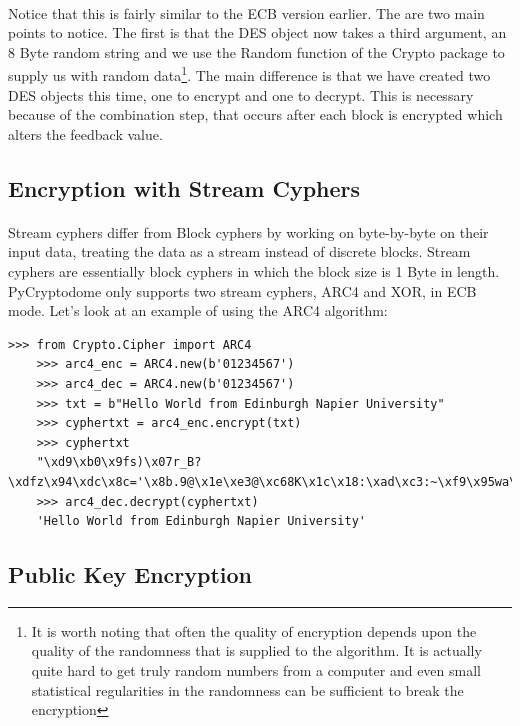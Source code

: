 \documentclass[12pt, a4paper, oneside]{book}
\begin{document}
{\paragraph{} Notice that this is fairly similar to the ECB version earlier. The are two main points to notice. The first is that the DES object now takes a third argument, an 8 Byte random string and we use the Random function of the Crypto package to supply us with random data\footnote{It is worth noting that often the quality of encryption depends upon the quality of the randomness that is supplied to the algorithm. It is actually quite hard to get truly random numbers from a computer and even small statistical regularities in the randomness can be sufficient to break the encryption}. The main difference is that we have created two DES objects this time, one to encrypt and one to decrypt. This is necessary because of the combination step, that occurs after each block is encrypted which alters the feedback value.

\subsection{Encryption with Stream Cyphers}
\paragraph{} Stream cyphers differ from Block cyphers by working on byte-by-byte on their input data, treating the data as a stream instead of discrete blocks. Stream cyphers are essentially block cyphers in which the block size is 1 Byte in length. PyCryptodome only supports two stream cyphers, ARC4 and XOR, in ECB mode. Let's look at an example of using the ARC4 algorithm:

\begin{lstlisting}[style=DOS]
    >>> from Crypto.Cipher import ARC4
    >>> arc4_enc = ARC4.new(b'01234567')
    >>> arc4_dec = ARC4.new(b'01234567')
    >>> txt = b"Hello World from Edinburgh Napier University"
    >>> cyphertxt = arc4_enc.encrypt(txt)
    >>> cyphertxt
    "\xd9\xb0\x9fs)\x07r_B?\xdfz\x94\xdc\x8c='\x8b.9@\x1e\xe3@\xc68K\x1c\x18:\xad\xc3:~\xf9\x95wa\xbcB\xa0U\x08\xe9"
    >>> arc4_dec.decrypt(cyphertxt)
    'Hello World from Edinburgh Napier University'
\end{lstlisting}


\subsection{Public Key Encryption}
}
\end{document}
